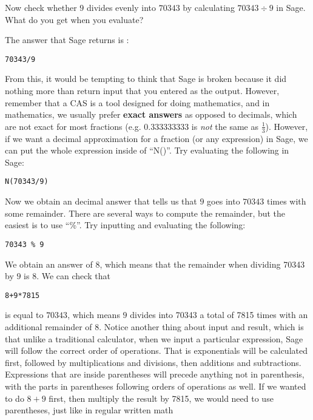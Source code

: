\documentclass[12pt]{amsart}
\theoremstyle{definition}
\theoremstyle{definition}
\begin{document}
Now check whether $9$ divides evenly into $70343$ by calculating
$70343 \div 9$ in Sage. What do you get when you evaluate?

The answer that Sage returns is :

\begin{verbatim}
70343/9
\end{verbatim}

From this, it would be tempting to think that Sage is broken because it
did nothing more than return input that you entered as the output.
However, remember that a CAS is a tool designed for doing mathematics,
and in mathematics, we usually prefer \textbf{exact answers} as opposed
to decimals, which are not exact for most fractions (e.g. 0.333333333 is
\textit{not} the same as $\frac{1}{3}$). However, if we want a
decimal approximation for a fraction (or any expression) in Sage, we can
put the whole expression inside of ``N()''. Try evaluating the following in
Sage:

\begin{verbatim}
N(70343/9)
\end{verbatim}

Now we obtain an decimal answer that tells us that $9$ goes into $70343$
times with some remainder. There are several ways to compute the
remainder, but the easiest is to use ``\%''. Try inputting and evaluating the
following:

\begin{verbatim}
70343 % 9
\end{verbatim}

We obtain an answer of 8, which means that the remainder when dividing
70343 by $9$ is 8. We can check that

\begin{verbatim}
8+9*7815
\end{verbatim}

is equal to $70343$, which means $9$ divides into 70343 a total of
7815 times with an additional remainder of 8. Notice another thing
about input and result, which is that unlike a traditional calculator,
when we input a particular expression, Sage will follow the correct
order of operations. That is exponentials will be calculated first,
followed by multiplications and divisions, then additions and subtractions.
Expressions that are inside parentheses will precede anything not
in parenthesis, with the parts in parentheses following orders of
operations as well. If we wanted to do $8+9$ first, then multiply the
result by 7815, we would need to use parentheses, just like in
regular written math
\end{document}

